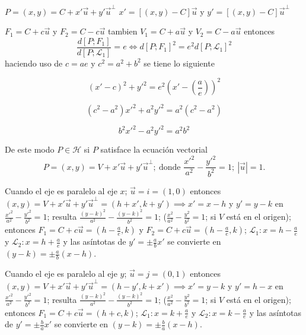\documentclass[12pt,]{report}
\theoremstyle{definition}
\theoremstyle{definition}
\theoremstyle{definition}
\theoremstyle{remark}
\begin{document}
\(P=(x,y)=C+x'\vec{u}+y'\vec{u}^\perp\) \(x'=[(x,y)-C]\vec{u}\) y \(y'=[(x,y)-C]\vec{u}^\perp\)

\(F_1=C+c\vec{u}\) y \(F_2=C-c\vec{u}\) tambien \(V_1=C+a\vec{u}\) y \(V_2=C-a\vec{u}\) entonces \[\frac{d\left[P;F_1\right]}{d\left[P;\mathcal{L}_1\right]}=e\iff d\left[P;F_1\right]^2=e^2d\left[P;\mathcal{L}_1\right]^2\] haciendo uso de \(c=ae\) y \(c^2=a^2+b^2\) se tiene lo siguiente

\[(x'-c)^2+y'^2=e^2\left(x'-\left(\frac{a}{e}\right)\right)^2\]

\[(c^2-a^2) x'^2+a^2y'^2=a^2(c^2-a^2)\]

\[b^2x'^2-a^2y'^2=a^2b^2\]

De este modo \(P\in\mathcal{H}\) si \(P\) satisface la ecuación vectorial \[P=(x,y)=V+x'\vec{u}+y'\vec{u}^\perp;\: \text{donde } \frac{x'^2}{a^2}-\frac{y'^2}{b^2}=1; \:\left|\vec{u}\right|=1.\]

Cuando el eje es paralelo al eje \(x\); \(\vec{u}=i=(1,0)\) entonces \((x,y)=V+x'\vec{u}+y'\vec{u}^\perp=(h+x',k+y')\implies x'=x-h\) y \(y'=y-k\) en \(\frac{x'^2}{a^2}-\frac{y'^2}{b^2}=1\); resulta \(\frac{(y-k)^2}{a^2}-\frac{(y-k)^2}{b^2}=1\); (\(\frac{x^2}{a^2}-\frac{y^2}{b^2}=1\); si \(V\) está en el origen); entonces \(F_1=C+c\vec{u}=(h-\frac{a}{e},k)\) y \(F_2=C+c\vec{u}=(h-\frac{a}{e},k)\); \(\mathcal{L}_1: x=h-\frac{a}{e}\) y \(\mathcal{L}_2: x=h+\frac{a}{e}\) y las asíntotas de \(y'=\pm\frac{a}{b}x'\) se convierte en \((y-k)=\pm\frac{a}{b}(x-h)\).

Cuando el eje es paralelo al eje \(y\); \(\vec{u}=j=(0,1)\) entonces \((x,y)=V+x'\vec{u}+y'\vec{u}^\perp=(h-y',k+x')\implies x'=y-k\) y \(y'=h-x\) en \(\frac{x'^2}{a^2}-\frac{y'^2}{b^2}=1\); resulta \(\frac{(y-k)^2}{a^2}-\frac{(y-k)^2}{b^2}=1\); (\(\frac{x^2}{a^2}-\frac{y^2}{b^2}=1\); si \(V\) está en el origen); entonces \(F_1=C+c\vec{u}=(h+c,k)\); \(\mathcal{L}_1: x=k+\frac{a}{e}\) y \(\mathcal{L}_2: x=k-\frac{a}{e}\) y las asíntotas de \(y'=\pm\frac{b}{a}x'\) se convierte en \((y-k)=\pm\frac{b}{a}(x-h)\).


\end{document}
